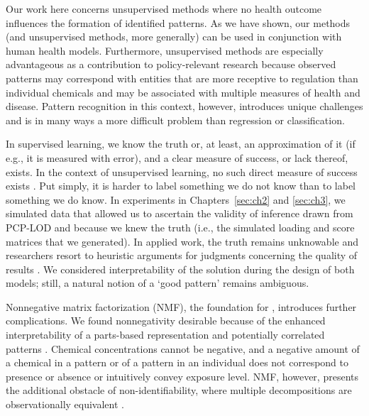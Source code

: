 Our work here concerns unsupervised methods where no health outcome influences the formation of identified patterns. As we have shown, our methods (and unsupervised methods, more generally) can be used in conjunction with human health models.  Furthermore, unsupervised methods are especially advantageous as a contribution to policy-relevant research because observed patterns may correspond with entities that are more receptive to regulation than individual chemicals and may be associated with multiple measures of health and disease. Pattern recognition in this context, however, introduces unique challenges and is in many ways a more difficult problem than regression or classification.

In supervised learning, we know the truth or, at least, an approximation of it (if e.g., it is measured with error), and a clear measure of success, or lack thereof, exists. In the context of unsupervised learning, no such direct measure of success exists \citep{ISLR}. Put simply, it is harder to label something we do not know than to label something we do know. In experiments in Chapters~\ref{sec:ch2} and \ref{sec:ch3}, we simulated data that allowed us to ascertain the validity of inference drawn from PCP-LOD and \bnmf because we knew the truth (i.e., the simulated loading and score matrices that we generated). In applied work, the truth remains unknowable and researchers resort to heuristic arguments for judgments concerning the quality of results \citep{friedman2001elements}. We considered interpretability of the solution during the design of both models; still, a natural notion of a `good pattern' remains ambiguous. 

Nonnegative matrix factorization (NMF), the foundation for \bnmfc, introduces further complications. We found nonnegativity desirable because of the enhanced interpretability of a parts-based representation and potentially correlated patterns \citep{lee1999learning, lee2001}. Chemical concentrations cannot be negative, and a negative amount of a chemical in a pattern or of a pattern in an individual does not correspond to presence or absence or intuitively convey exposure level. NMF, however, presents the additional obstacle of non-identifiability, where multiple decompositions are observationally equivalent \citep{donoho2004does}. 

